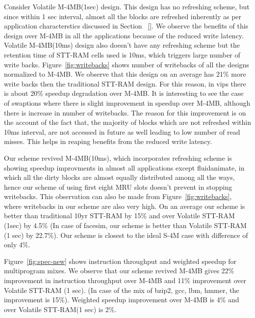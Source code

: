 Consider Volatile M-4MB(1sec) design. This design has no refreshing scheme, but since within 1 sec interval,
almost all the blocks are refreshed inherently as per application characterstics discussed in Section ~\ref{}.
We observe the benefits of this design over M-4MB in all the applications because of the reduced
write latency. Volatile M-4MB(10ms) design also 
doesn't have any refreshing scheme but the retention time of STT-RAM
cells used is 10ms, which triggers large number of write backs. 
Figure~\ref{fig:writebacks} shows number of writebacks of all the designs normalized to M-4MB. We observe that this design on an average has 21\% more 
write backs then the traditional STT-RAM design. For this reason, in vips there is about 20\% speedup degradation over M-4MB.
It is interesting to see the case of swaptions where there is slight improvement in speedup over M-4MB, although 
there is increase in number of writebacks. The reason for this improvement is on the account of the fact that, 
the majority of blocks which are not refreshed within 10ms interval, 
are not accessed in future as well leading to low number of read misses. This helps in reaping benefits
 from the reduced write latency.  

Our scheme revived M-4MB(10ms), which incorporates refreshing scheme is showing speedup improvments
in almost all applications except fluidanimate, in which all the dirty blocks are almost equally distributed among
all the ways, hence our scheme of using first eight MRU slots doesn't prevent in stopping writebacks. This
observation can also be made from Figure~\ref{fig:writebacks}, where writebacks in our scheme are also
very high. On an average our scheme is better than traditional 10yr STT-RAM by 15\% and over Volatile STT-RAM (1sec) 
by 4.5\% (In case of facesim, our scheme is better than Volatile STT-RAM (1 sec) by 22.7\%). 
Our scheme is closest to the ideal S-4M case with difference of only 4\%.

Figure~\ref{fig:spec-new} shows instruction throughput and weighted speedup for multiprogram
mixes. We observe that our scheme revived M-4MB gives 22\% improvement in instruction throughput 
over M-4MB and 11\% improvement over Volatile STT-RAM (1 sec). (In case of the mix of bzip2, gcc, lbm, hmmer, 
the improvement is 15\%). Weighted speedup improvement over M-4MB is 4\% 
and over Volatile STT-RAM(1 sec) is 2\%. 


